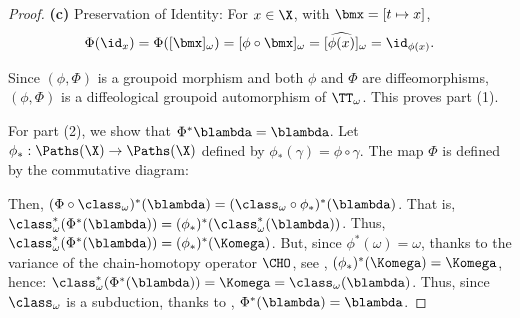 \begin{proof}
    \textbf{(c)} Preservation of Identity:
    For $x \in \X$,
    with $\bmx = [t \mapsto x]$,
    $$
      \Phi(\id_x) = \Phi([\bmx]_\omega) = [\phi \circ \bmx]_\omega = [\widehat{\phi(x)}]_\omega = \id_{\phi(x)}.
      $$
    
    Since $(\phi, \Phi)$ is a groupoid morphism and both $\phi$ and $\Phi$ are diffeomorphisms,
    $(\phi, \Phi)$ is a diffeological groupoid automorphism of $\TT_\omega$. This proves part (1).
    
    For part (2),
    we show that $\Phi^* \blambda = \blambda$.
    Let $\phi_* : \Paths(\X) \to \Paths(\X)$ defined by $\phi_*(\gamma) = \phi \circ \gamma$.
    The map $\Phi$ is defined by the commutative diagram:
    \begin{center}
    \end{center}
    Then,
    $(\Phi \circ \class_\omega)^*(\blambda) = (\class_\omega \circ \phi_*)^*(\blambda)$.
    That is,
    $\class_\omega^*(\Phi^*(\blambda)) = (\phi_*)^*(\class_\omega^*(\blambda))$.
    Thus,
    $\class_\omega^*(\Phi^*(\blambda)) = (\phi_*)^*(\Komega)$.
    But,
    since $\phi^*(\omega) = \omega$,
    thanks to the variance of the chain-homotopy operator $\CHO$,
    see \cite[]{PIZ13},
    $(\phi_*)^*(\Komega) = \Komega$,
    hence:
    $\class_\omega^*(\Phi^*(\blambda)) = \Komega = \class_\omega(\blambda)$.
    Thus,
    since $\class_\omega$ is a subduction,
    thanks to \cite[]{PIZ13},
    $\Phi^*(\blambda) = \blambda$.
  \end{proof}
  
  
  

